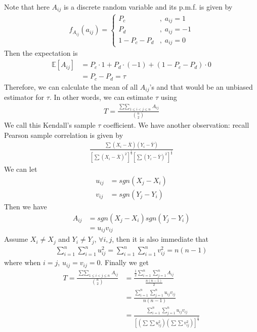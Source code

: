 \documentclass[twoside]{article}
\begin{document}
	Note that here $A_{ij}$ is a discrete random variable and its p.m.f. is given by
	\begin{align*}
		f_{A_{ij}} (a_{ij}) = \begin{cases}
			P_c &, \; a_{ij} = 1 \\
			P_d &, \; a_{ij} = -1 \\
			1 - P_c - P_d &, \; a_{ij} = 0
		\end{cases}
	\end{align*}
	Then the expectation is
	\begin{align*}
		\mathbb{E} \left[ A_{ij} \right] &= P_c \cdot 1 + P_d \cdot (-1) + (1 - P_c - P_d) \cdot 0 \\
		&= P_c - P_d = \tau
	\end{align*}
	Therefore, we can calculate the mean of all $A_{ij}$'s and that would be an unbiased estimator for $\tau$. In other words, we can estimate $\tau$ using
	\begin{align*}
		T = \frac{\mathop{\sum\sum}_{1 \leqslant i < j \leqslant n} A_{ij}}{\binom{n}{2}}
	\end{align*}
	We call this Kendall's sample $\tau$ coefficient. We have another observation: recall Pearson sample correlation is given by
	\begin{align*}
		\frac{\sum \left( X_i - \bar{X} \right) \left( Y_i - \bar{Y} \right)}{\left[ \sum \left( X_i - \bar{X} \right)^2 \right]^{\frac{1}{2}} \left[ \sum \left( Y_i - \bar{Y} \right)^2 \right]^{\frac{1}{2}}}
	\end{align*}
	We can let
	\begin{align*}
		u_{ij} &= sgn \left( X_j - X_i \right) \\
		v_{ij} &= sgn \left( Y_j - Y_i \right)
	\end{align*}
	Then we have
	\begin{align*}
		A_{ij} &= sgn \left( X_j - X_i \right) sgn \left( Y_j - Y_i \right) \\
		&= u_{ij} v_{ij}
	\end{align*}
	Assume $X_i \neq X_j$ and $Y_i \neq Y_j$, $\forall i,j$, then it is also immediate that 
	\begin{align*}
		\sum_{i=1}^{n} \sum_{i=1}^{n} u_{ij}^2 = \sum_{i=1}^{n} \sum_{i=1}^{n} v_{ij}^2 = n(n-1)
	\end{align*}
	where when $i=j$, $u_{ij} = v_{ij} = 0$. Finally we get
	\begin{align*}
		T = \frac{\mathop{\sum\sum}_{1 \leqslant i < j \leqslant n} A_{ij}}{\binom{n}{2}} &= \frac{\frac{1}{2} \sum_{i=1}^{n} \sum_{j=1}^{n} A_{ij}}{\frac{n(n-1)}{2}} \\
		&= \frac{\sum_{i=1}^{n} \sum_{j=1}^{n} u_{ij} v_{ij}}{n(n-1)} \\
		&= \frac{\sum_{i=1}^{n} \sum_{j=1}^{n} u_{ij} v_{ij}}{\left[ \left( \sum \sum u_{ij}^2 \right) \left( \sum \sum v_{ij}^2 \right) \right]^{\frac{1}{2}}}
	\end{align*}
\end{document}
